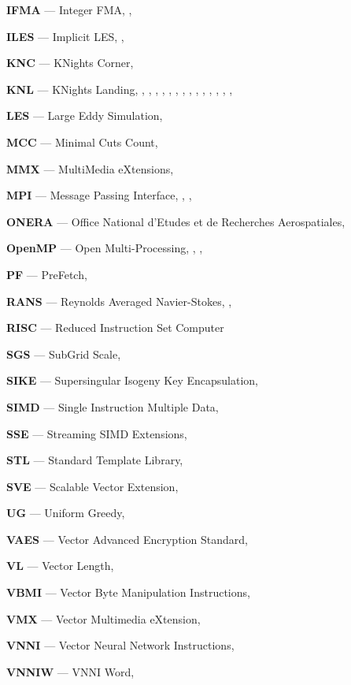 \textbf{IFMA} --- Integer FMA, \pageref{abbr:ifma}, \pageref{abbr:ifma2}

\textbf{ILES} --- Implicit LES, \pageref{abbr:iles}, \pageref{abbr:iles2}

\textbf{KNC} --- KNights Corner, \pageref{abbr:knc}

\textbf{KNL} --- KNights Landing, \pageref{abbr:knl}, \pageref{abbr:knl2}, \pageref{abbr:knl3}, \pageref{abbr:knl4}, \pageref{abbr:knl5}, \pageref{abbr:knl6}, \pageref{abbr:knl7}, \pageref{abbr:knl8}, \pageref{abbr:knl9}, \pageref{abbr:knl10}, \pageref{abbr:knl11}, \pageref{abbr:knl12}, \pageref{abbr:knl13}, \pageref{abbr:knl14}, \pageref{abbr:knl15}

\textbf{LES} --- Large Eddy Simulation, \pageref{abbr:les}

\textbf{MCC} --- Minimal Cuts Count, \pageref{abbr:mcc}

\textbf{MMX} --- MultiMedia eXtensions, \pageref{abbr:mmx}

\textbf{MPI} --- Message Passing Interface, \pageref{abbr:mpi}, \pageref{abbr:mpi2}, \pageref{abbr:mpi3}

\textbf{ONERA} --- Office National d'Etudes et de Recherches Aerospatiales, \pageref{abbr:onera}

\textbf{OpenMP} --- Open Multi-Processing, \pageref{abbr:openmp}, \pageref{abbr:openmp2}, \pageref{abbr:openmp3}

\textbf{PF} --- PreFetch, \pageref{abbr:pf}

\textbf{RANS} --- Reynolds Averaged Navier-Stokes, \pageref{abbr:rans}, \pageref{abbr:rans2}

\textbf{RISC} --- Reduced Instruction Set Computer

\textbf{SGS} --- SubGrid Scale, \pageref{abbr:sgs}

\textbf{SIKE} --- Supersingular Isogeny Key Encapsulation, \pageref{abbr:sike}

\textbf{SIMD} --- Single Instruction Multiple Data, \pageref{abbr:simd}

\textbf{SSE} --- Streaming SIMD Extensions, \pageref{abbr:sse}

\textbf{STL} --- Standard Template Library, \pageref{abbr:stl}

\textbf{SVE} --- Scalable Vector Extension, \pageref{abbr:sve}

\textbf{UG} --- Uniform Greedy, \pageref{abbr:ug}

\textbf{VAES} --- Vector Advanced Encryption Standard, \pageref{abbr:vaes}

\textbf{VL} --- Vector Length, \pageref{abbr:vl}

\textbf{VBMI} --- Vector Byte Manipulation Instructions, \pageref{abbr:vbmi}

\textbf{VMX} --- Vector Multimedia eXtension, \pageref{abbr:vmx}

\textbf{VNNI} --- Vector Neural Network Instructions, \pageref{abbr:vnni}

\textbf{VNNIW} --- VNNI Word, \pageref{abbr:vnniw}
